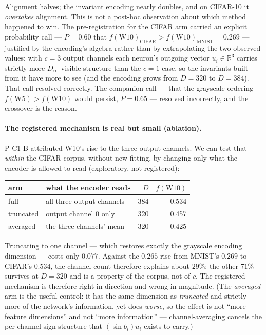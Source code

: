 \documentclass[10pt,letterpaper]{article}
\theoremstyle{definition}
\newcommand{\R}{\mathbb{R}}
\newcommand{\Dinf}{D_\infty}
\begin{document}
Alignment halves; the invariant encoding nearly doubles, and on CIFAR-10 it \emph{overtakes}
alignment. This is not a post-hoc observation about which method happened to win. The
pre-registration for the CIFAR arm carried an explicit probability call --- $P = 0.60$ that
$f(\mathrm{W10})_{\text{CIFAR}} > f(\mathrm{W10})_{\text{MNIST}} = 0.269$ --- justified by the
encoding's algebra rather than by extrapolating the two observed values: with $c = 3$ output
channels each neuron's outgoing vector $u_i \in \R^3$ carries strictly more $\Dinf$-visible
structure than the $c = 1$ case, so the invariants built from it have more to see (and the
encoding grows from $D = 320$ to $D = 384$). That call resolved correctly. The companion call ---
that the grayscale ordering $f(\mathrm{W5}) > f(\mathrm{W10})$ would persist, $P = 0.65$ ---
resolved incorrectly, and the crossover is the reason.

\paragraph{The registered mechanism is real but small (ablation).} P-C1-B attributed W10's rise to
the three output channels. We can test that \emph{within} the CIFAR corpus, without new fitting,
by changing only what the encoder is allowed to read (exploratory, not registered):

\begin{center}\small
\begin{tabular}{@{}llrr@{}}
\toprule
arm & what the encoder reads & $D$ & $f(\mathrm{W10})$ \\
\midrule
full        & all three output channels                & 384 & 0.534 \\
truncated   & output channel 0 only                    & 320 & 0.457 \\
averaged    & the three channels' mean                 & 320 & 0.425 \\
\bottomrule
\end{tabular}
\end{center}

Truncating to one channel --- which restores exactly the grayscale encoding dimension --- costs
only $0.077$. Against the $0.265$ rise from MNIST's $0.269$ to CIFAR's $0.534$, the channel count
therefore explains about $29\%$; the other $71\%$ survives at $D = 320$ and is a property of the
corpus, not of $c$. The registered mechanism is therefore right in direction and wrong in magnitude. (The \emph{averaged} arm is
the useful control: it has the same dimension as \emph{truncated} and strictly more of the
network's information, yet does \emph{worse}, so the effect is not ``more feature dimensions'' and
not ``more information'' --- channel-averaging cancels the per-channel sign structure that
$(\sin b_i)u_i$ exists to carry.)
\end{document}
